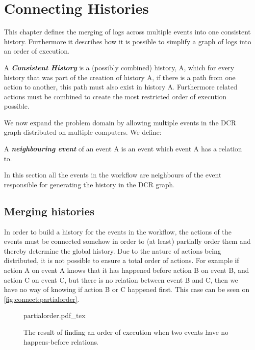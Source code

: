 \chapter{Connecting Histories} %
\label{chap:connecting-histories}
	This chapter defines the merging of logs across multiple events into one consistent history. Furthermore it describes how it is possible to simplify a graph of logs into an order of execution.
	
	\begin{definition}
		A \textit{\textbf{Consistent History}} is a (possibly combined) history, A, which for every history that was part of the creation of history A, if there is a path from one action to another, this path must also exist in history A. Furthermore related actions must be combined to create the most restricted order of execution possible.
	\end{definition} %
	\noindent We now expand the problem domain by allowing multiple events in the DCR graph distributed on multiple computers. We define:
	\begin{definition}
		A \textit{\textbf{neighbouring event}} of an event A is an event which event A has a relation to. 
	\end{definition}
	\noindent In this section all the events in the workflow are neighbours of the event responsible for generating the history in the DCR graph.
	
	\section{Merging histories} 
	In order to build a history for the events in the workflow, the actions of the events must be connected somehow in order to (at least) partially order them and thereby determine the global history. Due to the nature of actions being distributed, it is not possible to ensure a total order of actions. For example if action A on event A knows that it has happened before action B on event B, and action C on event C, but there is no relation between event B and C, then we have no way of knowing if action B or C happened first. This case can be seen on \autoref{fig:connect:partialorder}.
	
	\begin{figure}
		\centering
		{partialorder.pdf_tex}
		\caption{The result of finding an order of execution when two events have no happens-before relations.}
		\label{fig:connect:partialorder}
	\end{figure}
	
